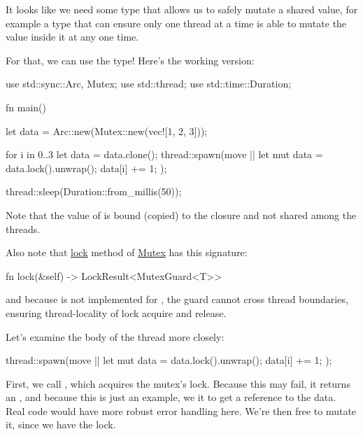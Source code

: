 \blank

It looks like we need some type that allows us to safely mutate a shared value, for example a type that can ensure only one thread 
at a time is able to mutate the value inside it at any one time.

\blank

For that, we can use the  type! Here's the working version:

\begin{rustc}
use std::sync::{Arc, Mutex};
use std::thread;
use std::time::Duration;

fn main() {
    let data = Arc::new(Mutex::new(vec![1, 2, 3]));

    for i in 0..3 {
        let data = data.clone();
        thread::spawn(move || {
            let mut data = data.lock().unwrap();
            data[i] += 1;
        });
    }

    thread::sleep(Duration::from_millis(50));
}
\end{rustc}

Note that the value of  is bound (copied) to the closure and not shared among the threads.

\blank

Also note that \href{https://doc.rust-lang.org/std/sync/struct.Mutex.html#method.lock}{lock} method of 
\href{https://doc.rust-lang.org/std/sync/struct.Mutex.html}{Mutex} has this signature:

\begin{rustc}
fn lock(&self) -> LockResult<MutexGuard<T>>
\end{rustc}

and because  is not implemented for , the guard cannot cross thread boundaries, ensuring 
thread-locality of lock acquire and release.

\blank

Let's examine the body of the thread more closely:

\begin{rustc}
thread::spawn(move || {
    let mut data = data.lock().unwrap();
    data[i] += 1;
});
\end{rustc}

First, we call , which acquires the mutex's lock. Because this may fail, it returns an , and because 
this is just an example, we  it to get a reference to the data. Real code would have more robust error handling here. 
We're then free to mutate it, since we have the lock.

